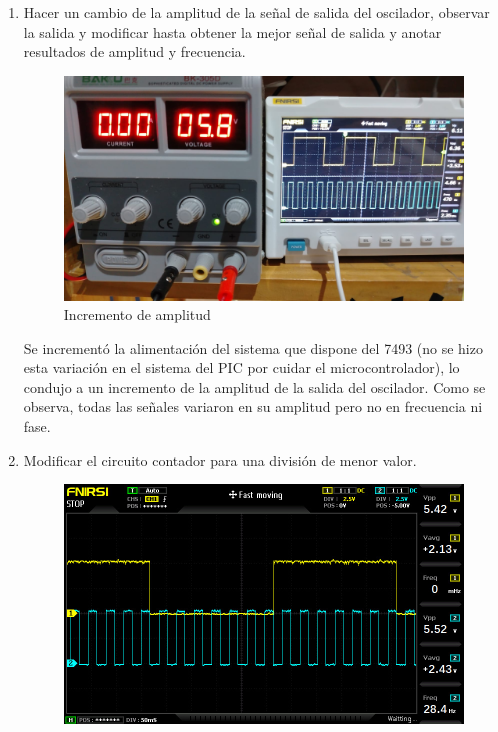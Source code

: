 \begin{enumerate} [label={\alph*.}]
\begin{figure}[H]
        \caption{Sintetizador con un PLL y un PIC16F628A}
    \end{figure}
    \begin{figure}[H]
        \centering
        \texttt{[image: imgs/5.2. Salida PIC.jpg]}
        \caption{Comparación entre la entada del demodulador de fase y el VCO (cambio cada 3 flancos)}
    \end{figure}
    \newpage
    \item Hacer un cambio de la amplitud de la señal de salida del oscilador, observar la salida y modificar hasta obtener la mejor señal de salida y anotar resultados de amplitud y frecuencia.
    \begin{figure}[H]
        \centering
        \includegraphics[width=.9\textwidth]{imgs/5.3. Nueva salida.jpg}
        \caption{Incremento de amplitud}
    \end{figure}
    Se incrementó la alimentación del sistema que dispone del 7493 (no se hizo esta variación en el sistema del PIC por cuidar el microcontrolador), lo condujo a un incremento de la amplitud de la salida del oscilador. Como se observa, todas las señales variaron en su amplitud pero no en frecuencia ni fase.
    \item Modificar el circuito contador para una división de menor valor.
    \begin{figure}[H]
        \centering
        \includegraphics[width=.8\textwidth]{imgs/5.5. Menos frecuencia.jpg}

\end{figure}
\end{enumerate}
